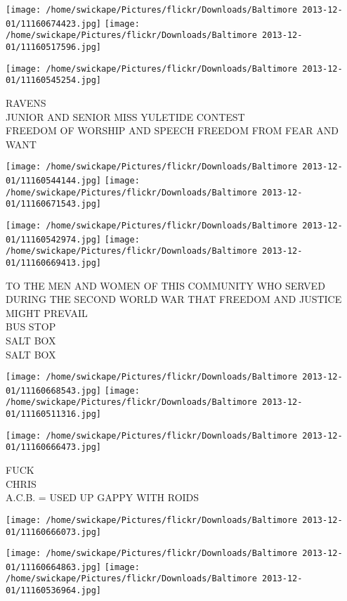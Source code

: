 \documentclass[10pt,letterpaper]{article}
\begin{document}
\texttt{[image: /home/swickape/Pictures/flickr/Downloads/Baltimore 2013-12-01/11160674423.jpg]}
\texttt{[image: /home/swickape/Pictures/flickr/Downloads/Baltimore 2013-12-01/11160517596.jpg]}

\vspace{0.25in}
\texttt{[image: /home/swickape/Pictures/flickr/Downloads/Baltimore 2013-12-01/11160545254.jpg]}

RAVENS\\
JUNIOR AND SENIOR MISS YULETIDE CONTEST\\
FREEDOM OF WORSHIP AND SPEECH FREEDOM FROM FEAR AND WANT\\
\pagebreak

\texttt{[image: /home/swickape/Pictures/flickr/Downloads/Baltimore 2013-12-01/11160544144.jpg]}
\texttt{[image: /home/swickape/Pictures/flickr/Downloads/Baltimore 2013-12-01/11160671543.jpg]}

\texttt{[image: /home/swickape/Pictures/flickr/Downloads/Baltimore 2013-12-01/11160542974.jpg]}
\texttt{[image: /home/swickape/Pictures/flickr/Downloads/Baltimore 2013-12-01/11160669413.jpg]}

TO THE MEN AND WOMEN OF THIS COMMUNITY WHO SERVED DURING THE SECOND WORLD WAR THAT FREEDOM AND JUSTICE MIGHT PREVAIL\\
BUS STOP\\
SALT BOX\\
SALT BOX\\
\pagebreak

\texttt{[image: /home/swickape/Pictures/flickr/Downloads/Baltimore 2013-12-01/11160668543.jpg]}
\texttt{[image: /home/swickape/Pictures/flickr/Downloads/Baltimore 2013-12-01/11160511316.jpg]}

\texttt{[image: /home/swickape/Pictures/flickr/Downloads/Baltimore 2013-12-01/11160666473.jpg]}

FUCK\\
CHRIS\\
A.C.B. = USED UP GAPPY WITH ROIDS\\
\pagebreak

\texttt{[image: /home/swickape/Pictures/flickr/Downloads/Baltimore 2013-12-01/11160666073.jpg]}

\vspace{0.25in}
\texttt{[image: /home/swickape/Pictures/flickr/Downloads/Baltimore 2013-12-01/11160664863.jpg]}
\texttt{[image: /home/swickape/Pictures/flickr/Downloads/Baltimore 2013-12-01/11160536964.jpg]}
\end{document}
